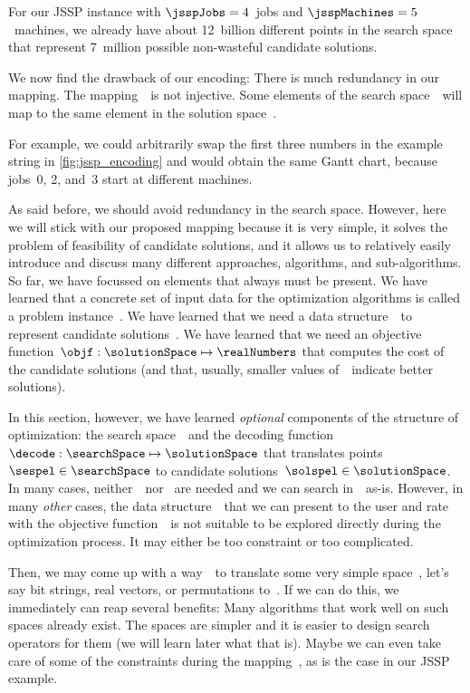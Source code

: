 For our  \gls{JSSP} instance with $\jsspJobs=4$~jobs and $\jsspMachines=5$~machines, we already have about 12~billion different points in the search space that represent 7~million possible non-wasteful candidate solutions.

We now find the drawback of our encoding:
There is much redundancy in our mapping.
The mapping~\decode\ is not injective.
Some elements of the search space~\searchSpace\ will map to the same element in the solution space~\solutionSpace.

For example, we could arbitrarily swap the first three numbers in the example string in \cref{fig:jssp_encoding} and would obtain the same Gantt chart, because jobs~0, 2, and~3 start at different machines.

As said before, we should avoid redundancy in the search space.
However, here we will stick with our proposed mapping because it is very simple, it solves the problem of feasibility of candidate solutions, and it allows us to relatively easily introduce and discuss many different approaches, algorithms, and sub-algorithms.%
\endhsection%
\endhsection%
%
%
So far, we have focussed on elements that always must be present.
We have learned that a concrete set of input data for the optimization algorithms is called a problem instance~\instance.
We have learned that we need a data structure~\solutionSpace\ to represent candidate solutions~\solspel.
We have learned that we need an objective function~$\objf:\solutionSpace\mapsto\realNumbers$ that computes the cost of the candidate solutions (and that, usually, smaller values of~\objf\ indicate better solutions).

In this section, however, we have learned \emph{optional} components of the structure of optimization: the search space~\searchSpace\ and the decoding function~$\decode:\searchSpace\mapsto\solutionSpace$ that translates points~$\sespel\in\searchSpace$ to candidate solutions~$\solspel\in\solutionSpace$.
In many cases, neither~\searchSpace\ nor \decode\ are needed and we can search in~\solutionSpace\ as-is.
However, in many \emph{other} cases, the data structure~\solutionSpace\ that we can present to the user and rate with the objective function~\objf\ is not suitable to be explored directly during the optimization process.
It may either be too constraint or too complicated.

Then, we may come up with a way~\decode\ to translate some very simple space~\searchSpace, let's say bit strings, real vectors, or permutations to~\solutionSpace.
If we can do this, we immediately can reap several benefits:
Many algorithms that work well on such spaces already exist.
The spaces are simpler and it is easier to design search operators for them (we will learn later what that is).
Maybe we can even take care of some of the constraints during the mapping~\decode, as is the case in our \gls{JSSP} example.

